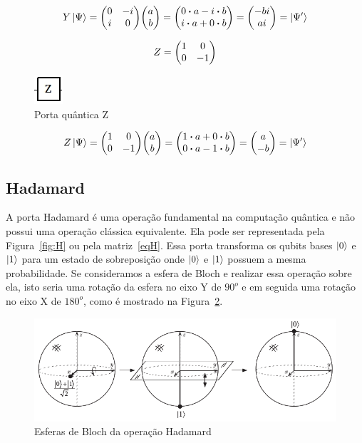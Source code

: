 \documentclass[a4paper, 12pt, oneside]{book}
\begin{document}
\begin{align*}
Y\ket{\Psi} = \mqty(0&-i\\i&0)\mqty(a\\b) = \mqty(0 \vdot a-i \vdot b \\i \vdot a+0 \vdot b) = \mqty(-bi\\ai) = \ket{\Psi'}
\end{align*}

\begin{equation}\label{eqZ}
Z =  \mqty(1&0\\0&-1)
\end{equation}

\begin{figure}[H]
\centering
\includegraphics[scale=0.75]{z.jpg}
\caption{Porta quântica Z}
\label{fig:z}
\end{figure}

\begin{align*}
Z\ket{\Psi} = \mqty(1&0\\0&-1)\mqty(a\\b) = \mqty(1 \vdot a+0 \vdot b \\0 \vdot a-1 \vdot b) = \mqty(a\\-b) = \ket{\Psi'}
\end{align*}

\subsection{Hadamard} 
A porta Hadamard é uma operação fundamental na computação quântica e não possui uma operação clássica equivalente. Ela pode ser representada pela Figura~\ref{fig:H} ou pela matriz~\eqref{eqH}. Essa porta transforma os qubits bases $\ket{0}$ e $\ket{1}$ para um estado de sobreposição onde $\ket{0}$ e $\ket{1}$ possuem a mesma probabilidade. Se consideramos a esfera de Bloch e realizar essa operação sobre ela, isto seria uma rotação da esfera no eixo Y de $90^o$ e em seguida uma rotação no eixo X de $180^o$, como é mostrado na Figura~\ref{fig:h_sphere}.

\begin{figure}[H]
\centering
\includegraphics[scale=0.6]{h_sphere.png}
\caption{Esferas de Bloch da operação Hadamard}
\label{fig:h_sphere}
\end{figure}
\end{document}
